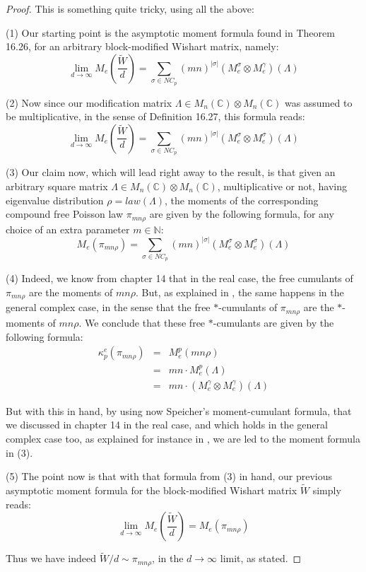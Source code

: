 \documentclass[12pt]{amsbook}
\begin{document}
\begin{proof}
This is something quite tricky, using all the above:

\medskip

(1) Our starting point is the asymptotic moment formula found in Theorem 16.26, for an arbitrary block-modified Wishart matrix, namely:
$$\lim_{d\to\infty}M_e\left(\frac{\widetilde{W}}{d}\right)=\sum_{\sigma\in NC_p}(mn)^{|\sigma|}(M^\sigma_e\otimes M^\gamma_e)(\Lambda)$$

(2) Now since our modification matrix $\Lambda\in M_n(\mathbb C)\otimes M_n(\mathbb C)$ was assumed to be multiplicative, in the sense of Definition 16.27, this formula reads:
$$\lim_{d\to\infty}M_e\left(\frac{\widetilde{W}}{d}\right)=\sum_{\sigma\in NC_p}(mn)^{|\sigma|}(M^\sigma_e\otimes M^\sigma_e)(\Lambda)$$

(3) Our claim now, which will lead right away to the result, is that given an arbitrary square matrix $\Lambda\in M_n(\mathbb C)\otimes M_n(\mathbb C)$, multiplicative or not, having eigenvalue distribution $\rho=law(\Lambda)$, the moments of the corresponding compound free Poisson law $\pi_{mn\rho}$ are given by the following formula, for any choice of an extra parameter $m\in\mathbb N$:
$$M_e(\pi_{mn\rho})=\sum_{\sigma\in NC_p}(mn)^{|\sigma|}(M^\sigma_e\otimes M^\sigma_e)(\Lambda)$$

(4) Indeed, we know from chapter 14 that in the real case, the free cumulants of $\pi_{mn\rho}$ are the moments of $mn\rho$. But, as explained in \cite{nsp}, the same happens in the general complex case, in the sense that the free $*$-cumulants of $\pi_{mn\rho}$ are the $*$-moments of $mn\rho$. We conclude that these free $*$-cumulants are given by the following formula:
\begin{eqnarray*}
\kappa_p^e(\pi_{mn\rho})
&=&M^p_e(mn\rho)\\
&=&mn\cdot M^p_e(\Lambda)\\
&=&mn\cdot (M^\gamma_e\otimes M^\gamma_e)(\Lambda)
\end{eqnarray*}

But with this in hand, by using now Speicher's moment-cumulant formula, that we discussed in chapter 14 in the real case, and which holds in the general complex case too, as explained for instance in \cite{nsp}, we are led to the moment formula in (3).

\medskip

(5) The point now is that with that formula from (3) in hand, our previous asymptotic moment formula for the block-modified Wishart matrix $\widetilde{W}$ simply reads:
$$\lim_{d\to\infty}M_e\left(\frac{\widetilde{W}}{d}\right)=M_e(\pi_{mn\rho})$$

Thus we have indeed $\widetilde{W}/d\sim\pi_{mn\rho}$, in the $d\to\infty$ limit, as stated.
\end{proof}
\end{document}
